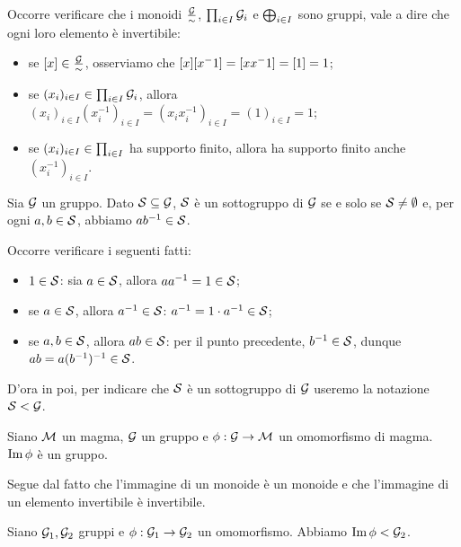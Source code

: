 \Proof Occorre verificare che i monoidi $\Quotient{\Group}{\Equivalence}$, $\prod_{i \in I} \mathcal{G}_i$ e $\bigoplus_{i \in I}$ sono gruppi, vale a dire che ogni loro elemento \`e invertibile:
	\begin{itemize}
		\item se $\EquivalenceClass{x} \in \Quotient{\Group}{\Equivalence}$, osserviamo che $\EquivalenceClass{x}\EquivalenceClass{x^-1} = \EquivalenceClass{xx^-1} = \EquivalenceClass{1} = 1$;
		\item se $(x_i)_{i \in I} \in \prod_{i \in I} \mathcal{G}_i$, allora $(x_i)_{i \in I} (x_i^{-1})_{i \in I} = (x_ix_i^{-1})_{i \in I} = (1)_{i \in I} = 1$;
		\item se $(x_i)_{i \in I} \in \prod_{i \in I}$ ha supporto finito, allora ha supporto finito anche $(x_i^{-1})_{i \in I}$. \EndProof
	\end{itemize}
\begin{Theorem}
	Sia $\mathcal{G}$ un gruppo. Dato $\mathcal{S} \subseteq \mathcal{G}$, $\mathcal{S}$ \`e un sottogruppo di $\mathcal{G}$ se e solo se $\mathcal{S} \neq \emptyset$ e, per ogni $a,b \in \mathcal{S}$, abbiamo $ab^{-1} \in \mathcal{S}$.
\end{Theorem}
\Proof Occorre verificare i seguenti fatti:
\begin{itemize}
	\item $1 \in \mathcal{S}$: sia $a \in \mathcal{S}$, allora $aa^{-1} = 1 \in \mathcal{S}$;
	\item se $a \in \mathcal{S}$, allora $a^{-1} \in \mathcal{S}$: $a^{-1} = 1 \cdot a^{-1} \in \mathcal{S}$;
	\item se $a, b \in \mathcal{S}$, allora $ab \in \mathcal{S}$: per il punto precedente, $b^{-1} \in \mathcal{S}$, dunque $ab = a(b^{-1})^{-1} \in \mathcal{S}$. \EndProof
\end{itemize}
\par D'ora in poi, per indicare che $\mathcal{S}$ \`e un sottogruppo di $\mathcal{G}$ useremo la notazione $\mathcal{S} < \mathcal{G}$.
\begin{Theorem}
	Siano $\mathcal{M}$ un magma, $\mathcal{G}$ un gruppo e $\phi: \mathcal{G} \rightarrow \mathcal{M}$ un omomorfismo di magma. $\operatorname{Im}{\phi}$ \`e un gruppo.
\end{Theorem}
\Proof Segue dal fatto che l'immagine di un monoide \`e un monoide e che l'immagine di un elemento invertibile \`e invertibile. \EndProof
\begin{Corollary}
	Siano $\mathcal{G}_1, \mathcal{G}_2$ gruppi e $\phi: \mathcal{G}_1 \rightarrow \mathcal{G}_2$ un omomorfismo. Abbiamo $\operatorname{Im}{\phi} < \mathcal{G}_2$.
\end{Corollary}
